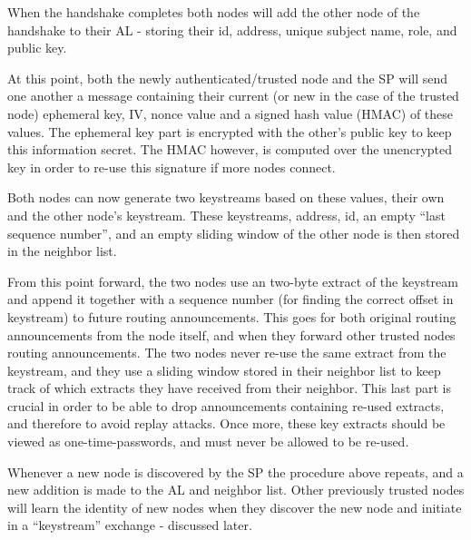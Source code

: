 When the handshake completes both nodes will add the other node of the handshake
to their \ac{AL} - storing their id, address, unique subject name, role, and
public key.

At this point, both the newly authenticated/trusted node and the \ac{SP} will
send one another a message containing their current (or new in the case of the
trusted node) ephemeral key, \ac{IV}, nonce value and a signed hash value (HMAC) of
these values. The ephemeral key part is encrypted with the other's public key to
keep this information secret. The HMAC however, is computed over the unencrypted
key in order to re-use this signature if more nodes connect.

Both nodes can now generate two keystreams based on these values, their own and
the other node's keystream. These keystreams, address, id, an empty ``last
sequence number'', and an empty sliding window of the other node is then stored
in the neighbor list.


From this point forward, the two nodes use an two-byte extract of the keystream
and append it together with a sequence number (for finding the correct offset
in keystream) to future routing announcements. This goes for both original
routing announcements from the node itself, and when they forward other trusted
nodes routing announcements. The two nodes never re-use the same extract from
the keystream, and they use a sliding window stored in their neighbor list to
keep track of which extracts they have received from their neighbor. This last
part is crucial in order to be able to drop announcements containing re-used
extracts, and therefore to avoid replay attacks. Once more, these key extracts
should be viewed as one-time-passwords, and must never be allowed to be re-used.

Whenever a new node is discovered by the \ac{SP} the procedure above repeats,
and a new addition is made to the \ac{AL} and neighbor list. Other previously
trusted nodes will learn the identity of new nodes when they discover the new
node and initiate in a ``keystream'' exchange - discussed later.

